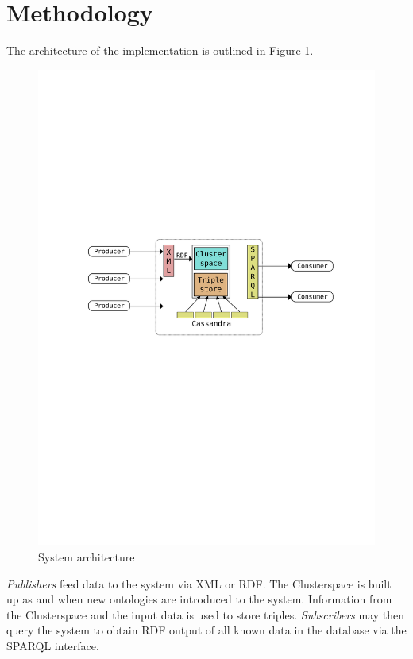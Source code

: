 \documentclass[journal]{IEEEtran}
\begin{document}
\section{Methodology}
The architecture of the implementation is outlined in Figure \ref{fig:architecture}.

\begin{figure}[h]
    \centering
    \includegraphics[scale=0.5]{images/architecture}
    \caption{System architecture}
    \label{fig:architecture}
\end{figure}

\emph{Publishers} feed data to the system via XML or RDF. The Clusterspace is
built up as and when new ontologies are introduced to the system. Information
from the Clusterspace and the input data is used to store triples.
\emph{Subscribers} may then query the system to obtain RDF output of all known
data in the database via the SPARQL interface.
\end{document}
